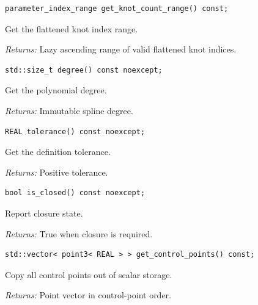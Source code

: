\par\noindent\begin{minipage}{\linewidth}
\begin{lstlisting}[style=apireference]
parameter_index_range get_knot_count_range() const;
\end{lstlisting}
{\footnotesize Get the flattened knot index range.\par}
{\footnotesize\textit{Returns:} Lazy ascending range of valid flattened knot indices.\par}
\end{minipage}\par\vspace{1pt}
\par\noindent\begin{minipage}{\linewidth}
\begin{lstlisting}[style=apireference]
std::size_t degree() const noexcept;
\end{lstlisting}
{\footnotesize Get the polynomial degree.\par}
{\footnotesize\textit{Returns:} Immutable spline degree.\par}
\end{minipage}\par\vspace{1pt}
\par\noindent\begin{minipage}{\linewidth}
\begin{lstlisting}[style=apireference]
REAL tolerance() const noexcept;
\end{lstlisting}
{\footnotesize Get the definition tolerance.\par}
{\footnotesize\textit{Returns:} Positive tolerance.\par}
\end{minipage}\par\vspace{1pt}
\par\noindent\begin{minipage}{\linewidth}
\begin{lstlisting}[style=apireference]
bool is_closed() const noexcept;
\end{lstlisting}
{\footnotesize Report closure state.\par}
{\footnotesize\textit{Returns:} True when closure is required.\par}
\end{minipage}\par\vspace{1pt}
\par\noindent\begin{minipage}{\linewidth}
\begin{lstlisting}[style=apireference]
std::vector< point3< REAL > > get_control_points() const;
\end{lstlisting}
{\footnotesize Copy all control points out of scalar storage.\par}
{\footnotesize\textit{Returns:} Point vector in control-point order.\par}
\end{minipage}\par\vspace{1pt}
